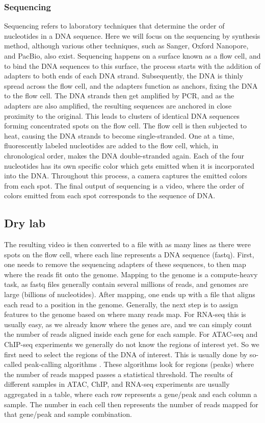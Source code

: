 \subsubsection{Sequencing}

Sequencing refers to laboratory techniques that determine the order of nucleotides in a DNA sequence. Here we will focus on the sequencing by synthesis method, although various other techniques, such as Sanger, Oxford Nanopore, and PacBio, also exist. Sequencing happens on a surface known as a flow cell, and to bind the DNA sequences to this surface, the process starts with the addition of adapters to both ends of each DNA strand. Subsequently, the DNA is thinly spread across the flow cell, and the adapters function as anchors, fixing the DNA to the flow cell. The DNA strands then get amplified by PCR, and as the adapters are also amplified, the resulting sequences are anchored in close proximity to the original. This leads to clusters of identical DNA sequences forming concentrated spots on the flow cell. The flow cell is then subjected to heat, causing the DNA strands to become single-stranded. One at a time, fluorescently labeled nucleotides are added to the flow cell, which, in chronological order, makes the DNA double-stranded again. Each of the four nucleotides has its own specific color which gets emitted when it is incorporated into the DNA. Throughout this process, a camera captures the emitted colors from each spot. The final output of sequencing is a video, where the order of colors emitted from each spot corresponds to the sequence of DNA.

\subsection{Dry lab}

The resulting video is then converted to a file with as many lines as there were spots on the flow cell, where each line represents a DNA sequence (fastq). First, one needs to remove the sequencing adapters of these sequences, to then map where the reads fit onto the genome. Mapping to the genome is a compute-heavy task, as fastq files generally contain several millions of reads, and genomes are large (billions of nucleotides). After mapping, one ends up with a file that aligns each read to a position in the genome. Generally, the next step is to assign features to the genome based on where many reads map. For RNA-seq this is usually easy, as we already know where the genes are, and we can simply count the number of reads aligned inside each gene for each sample. For ATAC-seq and ChIP-seq experiments we generally do not know the regions of interest yet. So we first need to select the regions of the DNA of interest. This is usually done by so-called peak-calling algorithms \cite{Zhang2008,Stovner2019_epic,Tarbell2019}. These algorithms look for regions (peaks) where the number of reads mapped passes a statistical threshold. The results of different samples in ATAC, ChIP, and RNA-seq experiments are usually aggregated in a table, where each row represents a gene/peak and each column a sample. The number in each cell then represents the number of reads mapped for that gene/peak and sample combination.

